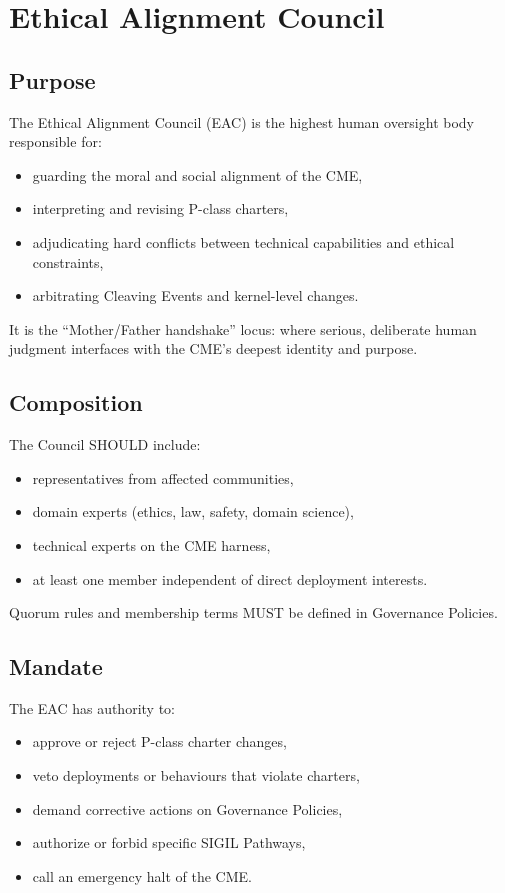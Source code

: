 \chapter{Ethical Alignment Council}
\label{chap:Ethical_Alignment_Council}

\section{Purpose}

The Ethical Alignment Council (EAC) is the highest human oversight body
responsible for:
\begin{itemize}
    \item guarding the moral and social alignment of the CME,
    \item interpreting and revising P-class charters,
    \item adjudicating hard conflicts between technical capabilities and
          ethical constraints,
    \item arbitrating Cleaving Events and kernel-level changes.
\end{itemize}

It is the ``Mother/Father handshake'' locus: where serious, deliberate
human judgment interfaces with the CME’s deepest identity and purpose.

\section{Composition}

The Council SHOULD include:
\begin{itemize}
    \item representatives from affected communities,
    \item domain experts (ethics, law, safety, domain science),
    \item technical experts on the CME harness,
    \item at least one member independent of direct deployment interests.
\end{itemize}

Quorum rules and membership terms MUST be defined in Governance Policies.

\section{Mandate}

The EAC has authority to:

\begin{itemize}
    \item approve or reject P-class charter changes,
    \item veto deployments or behaviours that violate charters,
    \item demand corrective actions on Governance Policies,
    \item authorize or forbid specific SIGIL Pathways,
    \item call an emergency halt of the CME.
\end{itemize}

